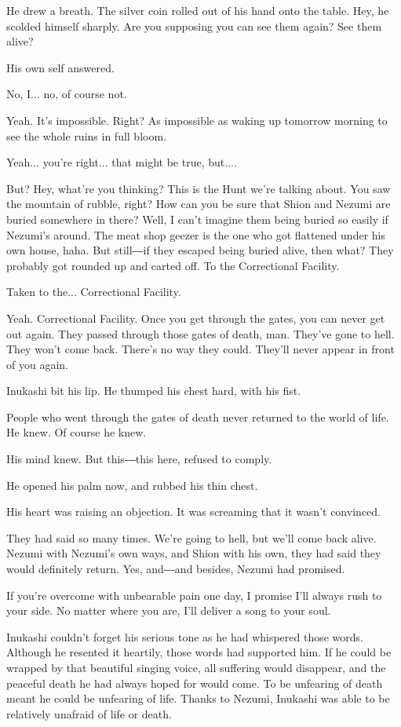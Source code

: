 He drew a breath. The silver coin rolled out of his hand onto the table.
Hey, he scolded himself sharply. Are you supposing you can see them
again? See them alive?

His own self answered.

No, I... no, of course not.

Yeah. It's impossible. Right? As impossible as waking up tomorrow
morning to see the whole ruins in full bloom.

Yeah... you're right... that might be true, but....

But? Hey, what're you thinking? This is the Hunt we're talking about.
You saw the mountain of rubble, right? How can you be sure that Shion
and Nezumi are buried somewhere in there? Well, I can't imagine them
being buried so easily if Nezumi's around. The meat shop geezer is the
one who got flattened under his own house, haha. But still―if they
escaped being buried alive, then what? They probably got rounded up and
carted off. To the Correctional Facility.

Taken to the... Correctional Facility.

Yeah. Correctional Facility. Once you get through the gates, you can
never get out again. They passed through those gates of death, man.
They've gone to hell. They won't come back. There's no way they could.
They'll never appear in front of you again.

Inukashi bit his lip. He thumped his chest hard, with his fist.

People who went through the gates of death never returned to the world
of life. He knew. Of course he knew.

His mind knew. But this―this here, refused to comply.

He opened his palm now, and rubbed his thin chest.

His heart was raising an objection. It was screaming that it wasn't
convinced.

They had said so many times. We're going to hell, but we'll come back
alive. Nezumi with Nezumi's own ways, and Shion with his own, they had
said they would definitely return. Yes, and―and besides, Nezumi had
promised.

If you're overcome with unbearable pain one day, I promise I'll always
rush to your side. No matter where you are, I'll deliver a song to your
soul.

Inukashi couldn't forget his serious tone as he had whispered those
words. Although he resented it heartily, those words had supported him.
If he could be wrapped by that beautiful singing voice, all suffering
would disappear, and the peaceful death he had always hoped for would
come. To be unfearing of death meant he could be unfearing of life.
Thanks to Nezumi, Inukashi was able to be relatively unafraid of life or
death.

